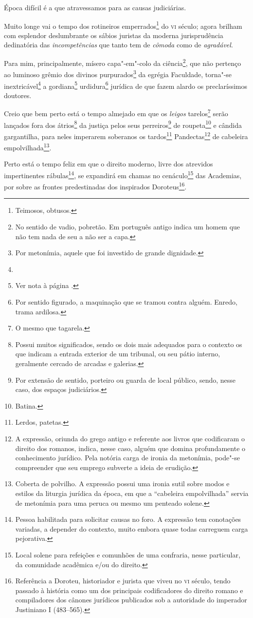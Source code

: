 Época difícil é a que atravessamos para as causas judiciárias.

Muito longe vai o tempo dos rotineiros emperrados\footnote{Teimosos,
  obtusos.} do \textsc{vi} século; agora brilham com esplendor deslumbrante os
sábios juristas da moderna jurisprudência dedinatória das
\emph{incompetências} que tanto tem de \emph{cômoda} como de
\emph{agradável}.

Para mim, principalmente, mísero capa"-em"-colo da ciência\footnote{No
  sentido de vadio, pobretão. Em português antigo indica um homem que
  não tem nada de seu a não ser a capa.}, que não pertenço ao luminoso
grêmio dos divinos purpurados\footnote{Por metonímia, aquele que foi
  investido de grande dignidade.} da egrégia Faculdade, torna"-se
inextricável\footnote{} a gordiana\footnote{Ver nota à página \pageref{gordio}.}
urdidura\footnote{Por sentido figurado, a maquinação que se tramou
  contra alguém. Enredo, trama ardilosa.} jurídica de que fazem alardo
os preclaríssimos doutores.

Creio que bem perto está o tempo almejado em que os \emph{leigos}
tarelos\footnote{O mesmo que tagarela.} serão
lançados fora dos átrios\footnote{Possui muitos significados, sendo os
  dois mais adequados para o contexto os que indicam a entrada exterior
  de um tribunal, ou seu pátio interno, geralmente cercado de arcadas e
  galerias.} da justiça pelos seus perreiros\footnote{Por extensão de
  sentido, porteiro ou guarda de local público, sendo, nesse caso, dos
  espaços judiciários.} de roupeta\footnote{Batina.} e cândida
gargantilha, para neles imperarem soberanos os tardos\footnote{Lerdos,
  patetas.} Pandectas\footnote{A expressão, oriunda do grego antigo e
  referente aos livros que codificaram o direito dos romanos, indica,
  nesse caso, alguém que domina profundamente o conhecimento jurídico.
  Pela notória carga de ironia da metonímia, pode"-se compreender que seu
  emprego subverte a ideia de erudição.} de cabeleira
empolvilhada\footnote{Coberta de polvilho. A expressão possui uma
  ironia sutil sobre modos e estilos da liturgia jurídica da época, em
que a ``cabeleira empolvilhada'' servia de metonímia para uma peruca ou
  mesmo um penteado solene.}.

Perto está o tempo feliz em que o direito moderno, livre dos atrevidos
impertinentes rábulas\footnote{Pessoa habilitada para solicitar causas
  no foro. A expressão tem conotações variadas, a depender do contexto,
  muito embora quase todas carreguem carga pejorativa.}, se expandirá em
chamas no cenáculo\footnote{Local solene para refeições e comunhões de
  uma confraria, nesse particular, da comunidade acadêmica e/ou do
  direito.} das Academias, por sobre as frontes predestinadas dos
inspirados Doroteus\footnote{Referência a Doroteu, historiador e
  jurista que viveu no \textsc{vi} século, tendo passado à história como um dos
  principais codificadores do direito romano e compiladores dos cânones
  jurídicos publicados sob a autoridade do imperador Justiniano I
  (483--565).}.

